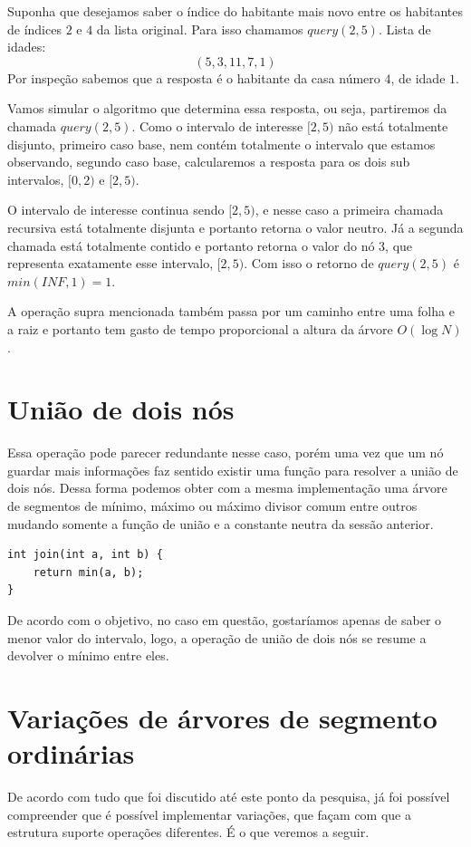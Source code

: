 Suponha que desejamos saber o índice do habitante mais novo entre os habitantes de índices $2$ e $4$ da lista original. Para isso chamamos $query(2, 5)$. 
Lista de idades: $$(5, 3, 11, 7, 1)$$
Por inspeção sabemos que a resposta é o habitante da casa número $4$, de idade $1$.

Vamos simular o algoritmo que determina essa resposta, ou seja, partiremos da chamada $query(2, 5)$. Como o intervalo de interesse $[2, 5)$ não está totalmente disjunto, primeiro caso base, nem contém totalmente o intervalo que estamos observando, segundo caso base, calcularemos a resposta para os dois sub intervalos, $[0, 2)$ e $[2, 5)$.

O intervalo de interesse continua sendo $[2, 5)$, e nesse caso a primeira chamada recursiva está totalmente disjunta e portanto retorna o valor neutro. Já a segunda chamada está totalmente contido e portanto retorna o valor do nó $3$, que representa exatamente esse intervalo, $[2, 5)$. Com isso o retorno de $query(2, 5)$ é $min(INF, 1) = 1$.

A operação supra mencionada também passa por um caminho entre uma folha e a raiz e portanto tem gasto de tempo proporcional a altura da árvore $O(\log N)$.


\section{União de dois nós}
Essa operação pode parecer redundante nesse caso, porém uma vez que um nó 
guardar mais informações faz sentido existir uma função para resolver a 
união de dois nós. Dessa forma podemos obter com a mesma implementação uma 
árvore de segmentos de mínimo, máximo ou máximo divisor comum entre outros 
mudando somente a função de união e a constante neutra da sessão anterior.
\begin{lstlisting}
int join(int a, int b) {
    return min(a, b);
}
\end{lstlisting}
De acordo com o objetivo, no caso em questão, gostaríamos apenas de saber o menor valor do intervalo, logo, a operação de união de dois nós se resume a devolver o mínimo entre eles.

\section{Variações de árvores de segmento ordinárias}
De acordo com tudo que foi discutido até este ponto da pesquisa, já foi possível compreender que é possível implementar variações, que façam com que a estrutura suporte operações diferentes. É o que veremos a seguir.

